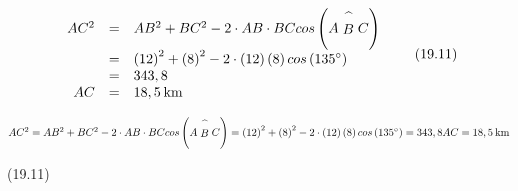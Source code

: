 {\begin{mdframed}[linewidth=4, leftmargin=40, rightmargin=40]
\begin{exercise}
\begin{enumerate}[noitemsep, label=\textbf{Step} \textbf{\arabic*}. ]
{    \begin{equation}
    \begin{array}{ccc}\hfill A{C}^{2}& =& A{B}^{2}+B{C}^{2}-2\ensuremath{\cdot}AB\ensuremath{\cdot}BCcos\left(A\stackrel{\mbox{\textasciicircum{}}}{B}C\right)\hfill \\ & =& {\left(12\right)}^{2}+{\left(8\right)}^{2}-2\ensuremath{\cdot}\left(12\right)\left(8\right)cos\left({135}^{\circ }\right)\hfill \\ & =& 343,8\hfill \\ \hfill AC& =& 18,5\phantom{\rule{2pt}{0ex}}\mathrm{km}\hfill \end{array}\tag{19.11}
      \end{equation}
    }{%
    \setlength{\mymathboxwidth}{\columnwidth}
      \addtolength{\mymathboxwidth}{-48pt}
    \par\vspace{12pt}\noindent\begin{minipage}{\columnwidth}
    \parbox[t]{\mymathboxwidth}{\large\begin{math}
    A{C}^{2}=A{B}^{2}+B{C}^{2}-2\ensuremath{\cdot}AB\ensuremath{\cdot}BCcos\left(A\stackrel{\mbox{\textasciicircum{}}}{B}C\right)={\left(12\right)}^{2}+{\left(8\right)}^{2}-2\ensuremath{\cdot}\left(12\right)\left(8\right)cos\left({135}^{\circ }\right)=343,8AC=18,5\phantom{\rule{2pt}{0ex}}\mathrm{km}\end{math}}\hfill
    \parbox[t]{48pt}{\raggedleft 
    (19.11)}
    \end{minipage}\vspace{12pt}\par
    }%
    

\end{enumerate}
\end{exercise}
\end{mdframed}}
